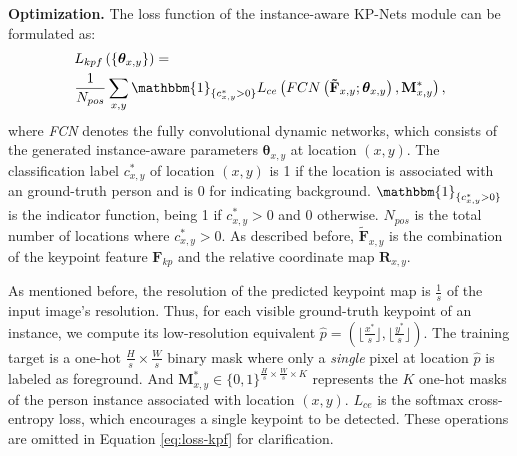\documentclass[sigconf]{acmart}
\begin{document}
\textbf{Optimization.}\quad
The loss function of the instance-aware KP-Nets module can be formulated as:
\begin{equation}
\begin{split}
  & L_{kpf} \left( \left\{ \bm{\theta}_{x,y} \right\} \right) = \\
  & \frac{1}{N_{pos}} \sum\limits_{x,y} \mathbbm{1}_{\{c_{x,y}^{*} > 0\}} L_{ce} \left( FCN \left( \mathbf{\tilde{F}}_{x,y}; \bm{\theta}_{x,y} \right), \mathbf{M}_{x,y}^{*} \right),
\end{split}
\label{eq:loss-kpf}
\end{equation}
where \textit{FCN} denotes the fully convolutional dynamic networks, which consists of the generated instance-aware parameters $\bm{\theta}_{x,y}$ at location $(x,y)$.
The classification label $c_{x,y}^{*}$ of location $(x,y)$ is 1 if the location is associated with an ground-truth person and is 0 for indicating background.
\begin{math}
  \mathbbm{1}_{\{c_{x,y}^{*} > 0\}}
\end{math}
is the indicator function, being 1 if $c_{x,y}^{*} > 0$ and 0 otherwise.
${N_{pos}}$ is the total number of locations where $c_{x,y}^{*} > 0$.
As described before, $\mathbf{\tilde{F}}_{x,y}$ is the combination of the keypoint feature $\mathbf{F}_{kp}$ and the relative coordinate map $\mathbf{R}_{x,y}$.

As mentioned before, the resolution of the predicted keypoint map is $\frac{1}{s}$ of the input image’s resolution. Thus, for each visible ground-truth keypoint of an instance, we compute its low-resolution equivalent $\hat{p}=\left( \lfloor \frac{x^{*}}{s} \rfloor, \lfloor \frac{y^{*}}{s} \rfloor \right)$. The training target is a one-hot $\frac{H}{s} \times \frac{W}{s}$ binary mask where only a \textit{single} pixel at location $\hat{p}$ is labeled as foreground.
And
\begin{math}
  \mathbf{M}_{x,y}^{*} \in \{0,1\}^{\frac{H}{s} \times \frac{W}{s} \times K}
\end{math}
represents the $K$ one-hot masks of the person instance associated with location $(x,y)$. $L_{ce}$ is the softmax cross-entropy loss, which encourages a single keypoint to be detected. These operations are omitted in Equation \eqref{eq:loss-kpf} for clarification.
\end{document}
